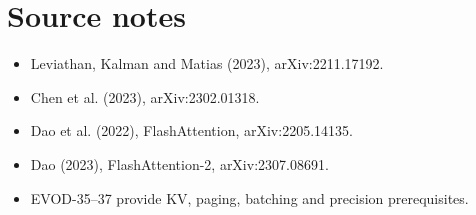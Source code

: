 \chapter*{Source notes}
\begin{itemize}\item Leviathan, Kalman and Matias (2023), arXiv:2211.17192.\item Chen et al. (2023), arXiv:2302.01318.\item Dao et al. (2022), FlashAttention, arXiv:2205.14135.\item Dao (2023), FlashAttention-2, arXiv:2307.08691.\item EVOD-35--37 provide KV, paging, batching and precision prerequisites.\end{itemize}
